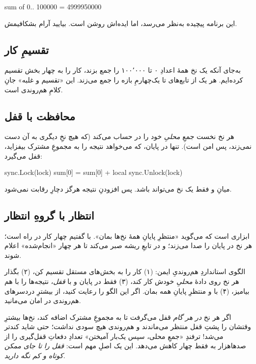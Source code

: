 \begin{progout}
sum of 0.. 100000 = 4999950000
\end{progout}

این برنامه پیچیده به‌نظر می‌رسد، اما ایده‌اش روشن است. بیایید آرام بشکافیمش.

\subsection{تقسیمِ کار}

به‌جای آنکه یک نخ همهٔ اعدادِ ۰ تا ۱۰۰٬۰۰۰ را جمع بزند، کار را به چهار بخش
تقسیم کرده‌ایم. هر یک از تابع‌های  تا  یک‌چهارمِ بازه را جمع
می‌زند. این «تقسیم و غلبه» جانِ کلامِ هم‌روندی است.

\subsection{محافظت با قفل}

هر نخ نخست جمعِ \emph{محلیِ} خود را در  حساب می‌کند (که هیچ نخِ
دیگری به آن دست نمی‌زند، پس امن است). تنها در پایان، که می‌خواهد نتیجه را به
مجموعِ مشترک بیفزاید، قفل می‌گیرد:

\begin{salamen}
sync.Lock(lock)
sum[0] = sum[0] + local
sync.Unlock(lock)
\end{salamen}

میانِ  و  فقط یک نخ می‌تواند باشد. پس افزودنِ نتیجه
هرگز دچارِ رقابت نمی‌شود.

\subsection{انتظار با گروهِ انتظار}

 ابزاری است که می‌گوید «منتظرِ پایانِ همهٔ نخ‌ها بمان». با
 گفتیم چهار کار در راه است؛ هر نخ در پایان
 را صدا می‌زند؛ و  در تابعِ ریشه صبر
می‌کند تا هر چهار «انجام‌شده» اعلام شوند.

\begin{tip}
الگوی استانداردِ هم‌روندیِ ایمن: (۱) کار را به بخش‌های مستقل تقسیم کن، (۲)
بگذار هر نخ روی دادهٔ \emph{محلیِ} خودش کار کند، (۳) فقط در پایان و با
\emph{قفل}، نتیجه‌ها را با هم بیامیز، (۴) با  و  منتظرِ
پایانِ همه بمان. اگر این الگو را رعایت کنید، از بیشترِ دردسرهای هم‌روندی در امان
می‌مانید.
\end{tip}

\begin{deep}
اگر هر نخ \emph{در هر گام} قفل می‌گرفت تا به مجموعِ مشترک اضافه کند، نخ‌ها
بیشترِ وقتشان را پشتِ قفل منتظر می‌ماندند و هم‌روندی هیچ سودی نداشت؛ حتی شاید
کندتر می‌شد! ترفندِ «جمعِ محلی، سپس یک‌بار آمیختن» تعدادِ دفعاتِ قفل‌گیری را از
صدها‌هزار به فقط چهار کاهش می‌دهد. این یک اصلِ مهم است: \emph{قفل را تا جای
ممکن کوتاه و کم نگه دارید.}
\end{deep}

